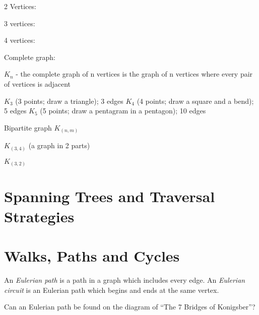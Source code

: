 2 Vertices:

3 vertices:

4 vertices:


Complete graph:

$K_n$ - the complete graph of n vertices is the graph of n vertices
where every pair of vertices is adjacent

$K_3$ (3 points; draw a triangle); 3 edges
$K_4$ (4 points; draw a square and a bend); 5 edges
$K_5$ (5 points; draw a pentagram in a pentagon); 10 edges

Bipartite graph
$K_(n,m)$

$K_(3,4)$ (a graph in 2 parts) %

$K_(3,2)$



\section{Spanning Trees and Traversal Strategies}
\label{chap:SpanningTreesAndTraversalStrategies}
\section{Walks, Paths and Cycles}
\label{sec:WalksPathsCycles}

An \emph{Eulerian path} is a path in a graph which includes every edge.
An \emph{Eulerian circuit} is an Eulerian path which begins and ends at the same
vertex.

Can an Eulerian path be found on the diagram of ``The 7 Bridges of Konigsber''?

